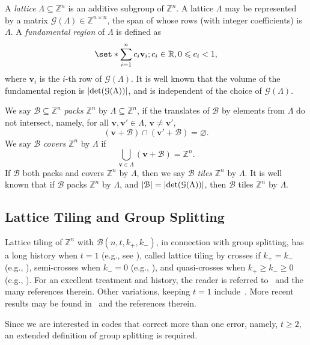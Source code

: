 \documentclass[sort&compress]{elsarticle}
\DeclarePairedDelimiter\abs{\lvert}{\rvert}
\newcommand{\cB}{\mathcal{B}}
\newcommand{\cG}{\mathcal{G}}
\renewcommand{\leq}{\leqslant}
\renewcommand{\geq}{\geqslant}
\newcommand{\R}{\mathbb{R}}
\newcommand{\Z}{\mathbb{Z}}
\newcommand{\vv}{\mathbf{v}}
\newcommand{\kp}{k_+}
\newcommand{\km}{k_-}
\begin{document}
A \emph{lattice} $\Lambda\subseteq\Z^n$ is an additive subgroup of
$\Z^n$. A lattice $\Lambda$ may be represented by a matrix
$\cG(\Lambda)\in\Z^{n\times n}$, the span of whose rows (with integer
coefficients) is $\Lambda$. A \emph{fundamental region} of $\Lambda$
is defined as
\[ \set*{ \sum_{i=1}^n c_i\vv_i ; c_i\in\R, 0\leq c_i < 1 },\]
where $\vv_i$ is the $i$-th row of $\cG(\Lambda)$. It is well known
that the volume of the fundamental region is $\abs{\det(\cG(\Lambda))}$, and
is independent of the choice of $\cG(\Lambda)$.

We say $\cB\subseteq\Z^n$ \emph{packs} $\Z^n$ by $\Lambda\subseteq\Z^n$, if
the translates of $\cB$ by elements from $\Lambda$ do not intersect,
namely, for all $\vv,\vv'\in\Lambda$, $\vv\neq\vv'$,
\[ (\vv+\cB)\cap(\vv'+\cB)=\varnothing.\]
We say $\cB$ \emph{covers} $\Z^n$ by $\Lambda$ if
\[ \bigcup_{\vv\in\Lambda} (\vv+\cB) = \Z^n.\]
If $\cB$ both packs and covers $\Z^n$ by $\Lambda$, then we say $\cB$
\emph{tiles} $\Z^n$ by $\Lambda$. It is well known that if $\cB$ packs
$\Z^n$ by $\Lambda$, and $\abs*{\cB}=\abs{\det(\cG(\Lambda))}$, then $\cB$
tiles $\Z^n$ by $\Lambda$.

\subsection{Lattice Tiling and Group Splitting}

Lattice tiling of $\Z^n$ with $\cB(n,t,\kp,\km)$, in connection with
group splitting, has a long history when $t=1$ (e.g., see
\cite{Ste67}), called lattice tiling by crosses if $\kp=\km$ (e.g.,
\cite{Ste84}), semi-crosses when $\km=0$ (e.g.,
\cite{Ste84,HamSte84,HicSte86}), and quasi-crosses when
$\kp\geq\km\geq 0$ (e.g., \cite{Sch12,Sch14}). For an excellent
treatment and history, the reader is referred to~\cite{SteSza94} and
the many references therein. Other variations, keeping $t=1$
include~\cite{Tam98,Tam05}. More recent results may be found
in~\cite{YeZhaZhaGe20} and the references therein.

Since we are interested in codes that correct more than one error,
namely, $t\geq 2$, an extended definition of group splitting is
required.
\end{document}
